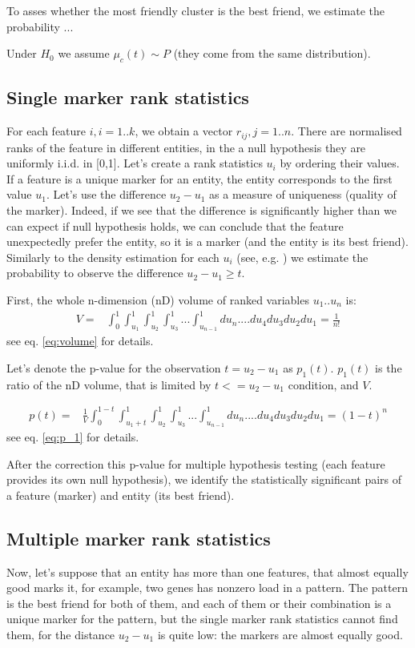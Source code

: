 \documentclass{llncs}
\begin{document}
To asses whether the most friendly cluster is the best friend, we estimate the probability ...

Under $H_0$ we assume $\mu_c(t) \sim P$ (they come from the same distribution).


 

\subsection{Single marker rank statistics}
For each feature $i,i=1..k$, we obtain a vector $r_{ij}, j=1..n$. There are normalised ranks of the feature in different entities, in the a null hypothesis they are uniformly i.i.d. in [0,1]. Let's create a rank statistics $u_i$ by ordering their values. If a feature is a unique marker for an entity, the entity corresponds to the first  value $u_1$. Let's use the difference $u_2-u_1$ as a measure of uniqueness (quality of the marker). Indeed, if we see that the difference is significantly higher than we can expect if null hypothesis holds, we can conclude that the feature unexpectedly prefer the entity, so it is a marker (and the entity is its best friend). Similarly to the density estimation for each $u_i$ (see, e.g. \cite{Gut:2009}) we estimate the probability to observe the difference $u_2 - u_1 \ge t$. 

First, the whole n-dimension (nD) volume of ranked variables $u_1 .. u_n$ is:
\begin{eqnarray*}
V = &\displaystyle \int_0^1\int_{u_1}^1\int_{u_2}^1\int_{u_3}^1...\int_{u_{n-1}}^1 du_n....du_4 du_3 du_2 du_1 =  \frac{1}{n!}
\end{eqnarray*}
see eq. \ref{eq:volume} for details.

Let's denote the p-value for the observation $t=u_2-u_1$ as $p_1(t)$. $p_1(t)$ is the ratio of the nD volume, that is limited by $t<=u_2-u_1$ condition, and $V$.

\begin{eqnarray*}
p(t) = & \displaystyle\frac{1}{V} \displaystyle \int_0^{1-t}\int_{{u_1}+t}^1\int_{u_2}^1\int_{u_3}^1...\int_{u_{n-1}}^1 du_n....du_4 du_3 du_2 du_1 = (1-t)^n
\end{eqnarray*}
see eq. \ref{eq:p_1} for details.

After the correction this p-value for multiple hypothesis testing (each feature provides its own null hypothesis), we identify the statistically significant pairs of a feature (marker) and entity (its best friend).

\subsection{Multiple marker rank statistics}
Now, let's suppose that an entity has more than one features, that almost equally good marks it, for example, two genes has nonzero load in a pattern. The pattern is the best friend for both of them, and each of them or their combination is a unique marker for the pattern, but the single marker rank statistics cannot find them, for the distance $u_2-u_1$ is quite low: the markers are almost equally good.
\end{document}
